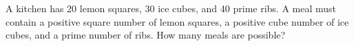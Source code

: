 A kitchen has 20 lemon squares, 30 ice cubes, and 40 prime ribs. A meal must contain a positive square number of lemon squares, a positive cube number of ice cubes, and a prime number of ribs. How many meals are possible?
